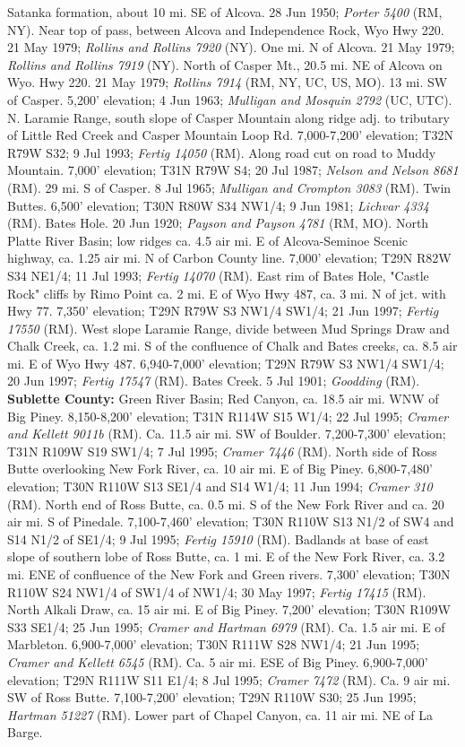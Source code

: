 Satanka formation, about 10 mi. SE of Alcova. 28 Jun 1950; \textit{Porter 5400} (RM, NY).  Near top of pass, between Alcova and Independence Rock, Wyo Hwy 220. 21 May 1979; \textit{Rollins and Rollins 7920} (NY).  One mi. N of Alcova. 21 May 1979; \textit{Rollins and Rollins 7919} (NY).   North of Casper Mt., 20.5 mi. NE of Alcova on Wyo. Hwy 220. 21 May 1979; \textit{Rollins 7914} (RM, NY, UC, US, MO).  13 mi. SW of Casper. 5,200’ elevation; 4 Jun 1963; \textit{Mulligan and Mosquin 2792} (UC, UTC).  N. Laramie Range, south slope of Casper Mountain along ridge adj. to tributary of Little Red Creek and Casper Mountain Loop Rd. 7,000-7,200’ elevation; T32N R79W S32; 9 Jul 1993; \textit{Fertig 14050} (RM).  Along road cut on road to Muddy Mountain. 7,000’ elevation; T31N R79W S4; 20 Jul 1987; \textit{Nelson and Nelson 8681} (RM).  29 mi. S of Casper. 8 Jul 1965; \textit{Mulligan and Crompton 3083} (RM).  Twin Buttes. 6,500’ elevation; T30N R80W S34 NW1/4; 9 Jun 1981; \textit{Lichvar 4334} (RM).  Bates Hole. 20 Jun 1920; \textit{Payson and Payson 4781} (RM, MO).  North Platte River Basin; low ridges ca. 4.5 air mi. E of Alcova-Seminoe Scenic highway, ca. 1.25 air mi. N of Carbon County line. 7,000’ elevation; T29N R82W S34 NE1/4; 11 Jul 1993; \textit{Fertig 14070} (RM).  East rim of Bates Hole, "Castle Rock" cliffs by Rimo Point ca. 2 mi. E of Wyo Hwy 487, ca. 3 mi. N of jct. with Hwy 77. 7,350’ elevation; T29N R79W S3 NW1/4 SW1/4; 21 Jun 1997; \textit{Fertig 17550} (RM).  West slope Laramie Range, divide between Mud Springs Draw and Chalk Creek, ca. 1.2 mi. S of the confluence of Chalk and Bates creeks, ca. 8.5 air mi. E of Wyo Hwy 487. 6,940-7,000' elevation; T29N R79W S3 NW1/4 SW1/4; 20 Jun 1997; \textit{Fertig 17547} (RM).  Bates Creek. 5 Jul 1901; \textit{Goodding} (RM).  \textbf{Sublette County:} Green River Basin; Red Canyon, ca. 18.5 air mi. WNW of Big Piney. 8,150-8,200’ elevation; T31N R114W S15 W1/4; 22 Jul 1995; \textit{Cramer and Kellett 9011b} (RM).  Ca. 11.5 air mi. SW of Boulder. 7,200-7,300’ elevation; T31N R109W S19 SW1/4; 7 Jul 1995; \textit{Cramer 7446} (RM).  North side of Ross Butte overlooking New Fork River, ca. 10 air mi. E of Big Piney. 6,800-7,480’ elevation; T30N R110W S13 SE1/4 and S14 W1/4; 11 Jun 1994; \textit{Cramer 310} (RM). North end of Ross Butte, ca. 0.5 mi. S of the New Fork River and ca. 20 air mi. S of Pinedale. 7,100-7,460’ elevation; T30N R110W S13 N1/2 of SW4 and S14 N1/2 of SE1/4; 9 Jul 1995; \textit{Fertig 15910} (RM).  Badlands at base of east slope of southern lobe of Ross Butte, ca. 1 mi. E of the New Fork River, ca. 3.2 mi. ENE of confluence of the New Fork and Green rivers. 7,300’ elevation; T30N R110W S24 NW1/4 of SW1/4 of NW1/4; 30 May 1997; \textit{Fertig 17415} (RM).  North Alkali Draw, ca. 15 air mi. E of Big Piney. 7,200’ elevation; T30N R109W S33 SE1/4; 25 Jun 1995; \textit{Cramer and Hartman 6979} (RM).  Ca. 1.5 air mi. E of Marbleton. 6,900-7,000’ elevation; T30N R111W S28 NW1/4; 21 Jun 1995; \textit{Cramer and Kellett 6545} (RM).  Ca. 5 air mi. ESE of Big Piney. 6,900-7,000’ elevation; T29N R111W S11 E1/4; 8 Jul 1995; \textit{Cramer 7472} (RM).  Ca. 9 air mi. SW of Ross Butte. 7,100-7,200’ elevation; T29N R110W S30; 25 Jun 1995; \textit{Hartman 51227} (RM).  Lower part of Chapel Canyon, ca. 11 air mi. NE of La Barge. 